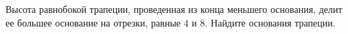 \begin{ex}
	\begin{condition}
		Высота равнобокой трапеции, проведенная из конца меньшего основания, делит ее большее основание на отрезки,	равные \( 4 \) и \( 8 \). Найдите основания трапеции.
	\end{condition}
\end{ex}